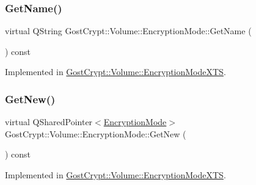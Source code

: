 \mbox{\label{class_gost_crypt_1_1_volume_1_1_encryption_mode_a8b82c75eb29a3149b1dd171624c3ede1}} 
\subsubsection{\texorpdfstring{Get\+Name()}{GetName()}}
{\footnotesize\ttfamily virtual Q\+String Gost\+Crypt\+::\+Volume\+::\+Encryption\+Mode\+::\+Get\+Name (\begin{DoxyParamCaption}{ }\end{DoxyParamCaption}) const\hspace{0.3cm}{\ttfamily [pure virtual]}}



Implemented in \hyperlink{class_gost_crypt_1_1_volume_1_1_encryption_mode_x_t_s_a3e4b43e1295accb96021b03deaa5e7b1}{Gost\+Crypt\+::\+Volume\+::\+Encryption\+Mode\+X\+TS}.

\mbox{\label{class_gost_crypt_1_1_volume_1_1_encryption_mode_ae64e9d022e271f747376c9db2aaad1b4}} 
\subsubsection{\texorpdfstring{Get\+New()}{GetNew()}}
{\footnotesize\ttfamily virtual Q\+Shared\+Pointer$<$\hyperlink{class_gost_crypt_1_1_volume_1_1_encryption_mode}{Encryption\+Mode}$>$ Gost\+Crypt\+::\+Volume\+::\+Encryption\+Mode\+::\+Get\+New (\begin{DoxyParamCaption}{ }\end{DoxyParamCaption}) const\hspace{0.3cm}{\ttfamily [pure virtual]}}



Implemented in \hyperlink{class_gost_crypt_1_1_volume_1_1_encryption_mode_x_t_s_a3d9c88420585ed76c1c11f541db973e1}{Gost\+Crypt\+::\+Volume\+::\+Encryption\+Mode\+X\+TS}.

